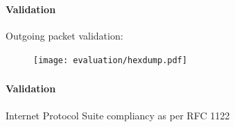 \begin{frame}%
    \frametitle{\EvaluationTitle}
    \framesubtitle{Validation}
    Outgoing packet validation:
    \begin{figure}
        \centering
        \texttt{[image: evaluation/hexdump.pdf]}
    \end{figure}
\end{frame}


\begin{frame}%
    \frametitle{\EvaluationTitle}
    \framesubtitle{Validation}
    Internet Protocol Suite compliancy as per RFC 1122
\end{frame}
